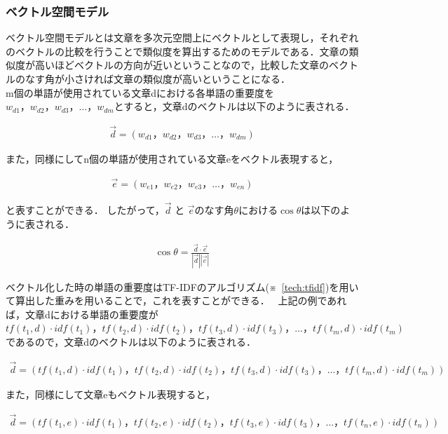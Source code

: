 \subsubsection{ベクトル空間モデル}
\label{tech:voctorkukan}
ベクトル空間モデルとは文章を多次元空間上にベクトルとして表現し，それぞれのベクトルの比較を行うことで類似度を算出するためのモデルである．文章の類似度が高いほどベクトルの方向が近いということなので，比較した文章のベクトルのなす角が小さければ文章の類似度が高いということになる．\\
m個の単語が使用されている文章dにおける各単語の重要度を$ w_{d1}，w_{d2}，w_{d3}， \ldots ，w_{dm} $とすると，文章dのベクトルは以下のように表される．

\begin{align}
\vec{d} = (w_{d1}，w_{d2}，w_{d3}， \ldots ，w_{dm}) \nonumber
\end{align}

また，同様にしてn個の単語が使用されている文章eをベクトル表現すると，

\begin{align}
\vec{e} = (w_{e1}，w_{e2}，w_{e3}， \ldots ，w_{en}) \nonumber
\end{align}

と表すことができる．
したがって，$ \vec{d} $ と $ \vec{e} $のなす角$ \theta $における$ \cos \theta $は以下のように表される．

\begin{align}
\cos \theta = \frac{\vec{d} \cdot \vec{e}}{|\vec{d}| |\vec{e}|} \nonumber
\end{align}

ベクトル化した時の単語の重要度はTF-IDFのアルゴリズム(※~\ref{tech:tfidf})を用いて算出した重みを用いることで，これを表すことができる．~\cite{voctormodel}
上記の例であれば，文章dにおける単語の重要度が$ tf(t_{1},d) \cdot idf(t_{1})，tf(t_{2},d) \cdot idf(t_{2})，tf(t_{3},d) \cdot idf(t_{3})， \ldots ，tf(t_{m},d) \cdot idf(t_{m}) $
であるので，文章dのベクトルは以下のように表される．

\begin{align}
\vec{d} = (tf(t_{1},d) \cdot idf(t_{1})，tf(t_{2},d) \cdot idf(t_{2})，tf(t_{3},d) \cdot idf(t_{3})， \ldots ，tf(t_{m},d) \cdot idf(t_{m})) \nonumber
\end{align}

また，同様にして文章eもベクトル表現すると，

\begin{align}
\vec{d} = (tf(t_{1},e) \cdot idf(t_{1})，tf(t_{2},e) \cdot idf(t_{2})，tf(t_{3},e) \cdot idf(t_{3})， \ldots ，tf(t_{n},e) \cdot idf(t_{n})) \nonumber
\end{align}

